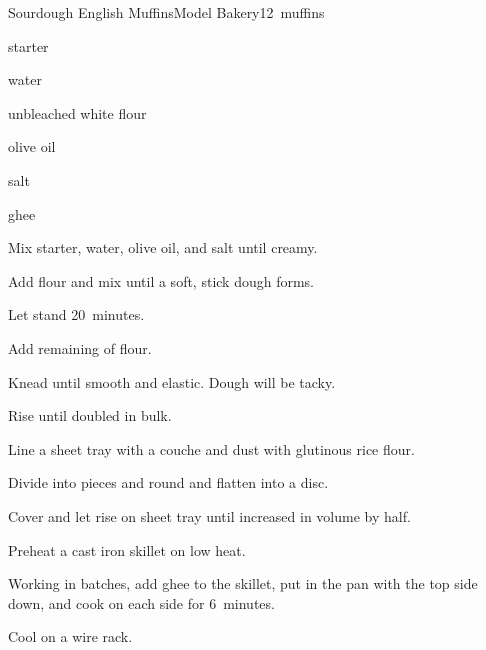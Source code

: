 \begin{recipe}{Sourdough English Muffins}{Model Bakery}{12~muffins}

\begin{ingredients}
\item {} starter
\item {} water
\item {} unbleached white flour
\item {} olive oil
\item {} salt
\item ghee
\end{ingredients}

\begin{directions}
\item Mix starter, water, olive oil, and salt until creamy.
\item Add  flour and mix until a soft, stick dough forms.
\item Let stand 20~minutes.
\item Add remaining  of flour.
\item Knead until smooth and elastic. Dough will be tacky.
\item Rise until doubled in bulk.
\item Line a sheet tray with a couche and dust with glutinous rice flour.
\item Divide into  pieces and round and flatten into a disc.
\item Cover and let rise on sheet tray until increased in volume by half.
\item Preheat a cast iron skillet on low heat.
\item Working in batches, add ghee to the skillet, put in the pan with the top side down, and cook on each side for 6~minutes.
\item Cool on a wire rack.
\end{directions}

\end{recipe}
